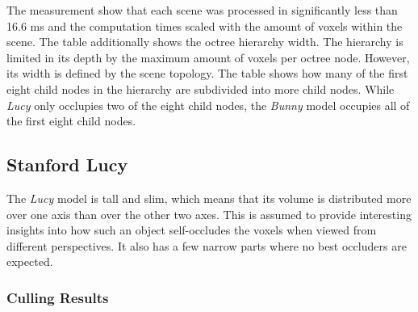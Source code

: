 \noindent
The measurement show that each scene was processed in significantly less than 16.6 ms and the 
computation times scaled with the amount of voxels within the scene. The table additionally shows 
the octree hierarchy width. The hierarchy is limited in its depth by the maximum amount of voxels 
per octree node. However, its width is defined by the scene topology. The table shows how many of 
the first eight child nodes in the hierarchy are subdivided into more child nodes. While \emph{Lucy} 
only occlupies two of the eight child nodes, the \emph{Bunny} model occupies all of the first eight 
child nodes.


\subsection*{Stanford Lucy}

The \emph{Lucy} model is tall and slim, which means that its volume is distributed more over one axis 
than over the other two axes. This is assumed to provide interesting insights into how such an object 
self-occludes the voxels when viewed from different perspectives. It also has a few narrow parts where 
no best occluders are expected.


\subsubsection*{Culling Results} \label{subsubsec-culling-results-lucy}


